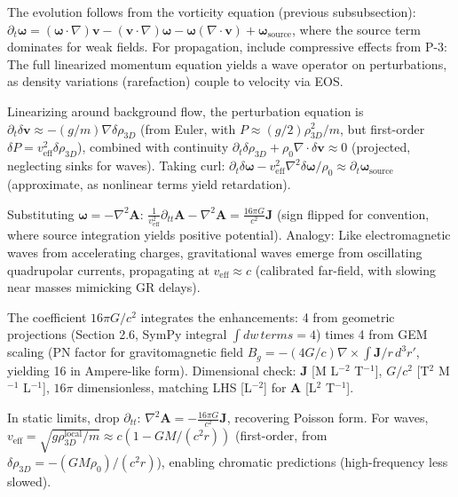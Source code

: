 The evolution follows from the vorticity equation (previous subsubsection): $\partial_t \boldsymbol{\omega} = (\boldsymbol{\omega} \cdot \nabla) \mathbf{v} - (\mathbf{v} \cdot \nabla) \boldsymbol{\omega} - \boldsymbol{\omega} (\nabla \cdot \mathbf{v}) + \boldsymbol{\omega}_{\text{source}}$, where the source term dominates for weak fields. For propagation, include compressive effects from P-3: The full linearized momentum equation yields a wave operator on perturbations, as density variations (rarefaction) couple to velocity via EOS.

Linearizing around background flow, the perturbation equation is $\partial_t \delta \mathbf{v} \approx - (g / m) \nabla \delta \rho_{3D}$ (from Euler, with $P \approx (g / 2) \rho_{3D}^2 / m$, but first-order $\delta P = v_{\text{eff}}^2 \delta \rho_{3D}$), combined with continuity $\partial_t \delta \rho_{3D} + \rho_0 \nabla \cdot \delta \mathbf{v} \approx 0$ (projected, neglecting sinks for waves). Taking curl: $\partial_t \delta \boldsymbol{\omega} - v_{\text{eff}}^2 \nabla^2 \delta \boldsymbol{\omega} / \rho_0 \approx \partial_t \boldsymbol{\omega}_{\text{source}}$ (approximate, as nonlinear terms yield retardation).

Substituting $\boldsymbol{\omega} = -\nabla^2 \mathbf{A}$: $\frac{1}{v_{\text{eff}}^2} \partial_{tt} \mathbf{A} - \nabla^2 \mathbf{A} = \frac{16\pi G}{c^2} \mathbf{J}$ (sign flipped for convention, where source integration yields positive potential). Analogy: Like electromagnetic waves from accelerating charges, gravitational waves emerge from oscillating quadrupolar currents, propagating at $v_{\text{eff}} \approx c$ (calibrated far-field, with slowing near masses mimicking GR delays).

The coefficient $16\pi G / c^2$ integrates the enhancements: 4 from geometric projections (Section 2.6, SymPy integral $\int dw \, terms = 4$) times 4 from GEM scaling (PN factor for gravitomagnetic field $B_g = - (4 G / c) \nabla \times \int \mathbf{J} / r \, d^3 r'$, yielding 16 in Ampere-like form). Dimensional check: $\mathbf{J}$ [M L$^{-2}$ T$^{-1}$], $G / c^2$ [T$^2$ M$^{-1}$ L$^{-1}$], $16\pi$ dimensionless, matching LHS [L$^{-2}$] for $\mathbf{A}$ [L$^2$ T$^{-1}$].

In static limits, drop $\partial_{tt}$: $\nabla^2 \mathbf{A} = - \frac{16\pi G}{c^2} \mathbf{J}$, recovering Poisson form. For waves, $v_{\text{eff}} = \sqrt{g \rho_{3D}^{\text{local}} / m} \approx c (1 - G M / (c^2 r))$ (first-order, from $\delta \rho_{3D} = - (G M \rho_0) / (c^2 r)$), enabling chromatic predictions (high-frequency less slowed).

